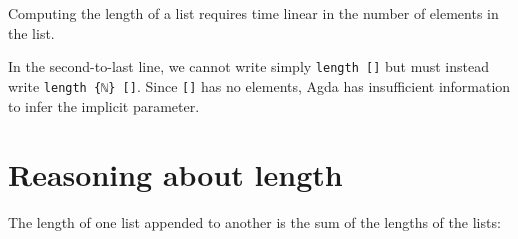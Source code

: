 Computing the length of a list requires time linear in the number of
elements in the list.

In the second-to-last line, we cannot write simply
\texttt{length\ {[}{]}} but must instead write
\texttt{length\ \{ℕ\}\ {[}{]}}. Since \texttt{{[}{]}} has no elements,
Agda has insufficient information to infer the implicit parameter.

\hypertarget{reasoning-about-length}{%
\section{Reasoning about length}\label{reasoning-about-length}}

The length of one list appended to another is the sum of the lengths of
the lists:

\begin{fence}
\begin{code}%
\>[0]\AgdaSpace{}%
\AgdaSymbol{:}\AgdaSpace{}%
\AgdaSpace{}%
\AgdaSymbol{\{}\AgdaSpace{}%
\AgdaSymbol{:}\AgdaSpace{}%
\AgdaSymbol{\}}\AgdaSpace{}%
\AgdaSymbol{(}\AgdaSpace{}%
\AgdaSpace{}%
\AgdaSymbol{:}\AgdaSpace{}%
\AgdaSpace{}%
\AgdaSymbol{)}\<%
\\
\>[0][@{}l@{\AgdaIndent{0}}]%
\>[2]\AgdaSpace{}%
\AgdaSpace{}%
\AgdaSymbol{(}\AgdaSpace{}%
\AgdaOperator{\AgdaFunction{++}}\AgdaSpace{}%
\AgdaSymbol{)}\AgdaSpace{}%
\AgdaSpace{}%
\AgdaSpace{}%
\AgdaSpace{}%
\AgdaOperator{\AgdaPrimitive{+}}\AgdaSpace{}%
\AgdaSpace{}%
\<%
\\
\>[0]\AgdaSpace{}%
\AgdaSymbol{\{}\AgdaSymbol{\}}\AgdaSpace{}%
\AgdaInductiveConstructor{[]}\AgdaSpace{}%
\AgdaSpace{}%
\AgdaSymbol{=}\<%
\\
\>[0][@{}l@{\AgdaIndent{0}}]%
\>[2]\<%
\\
\>[2][@{}l@{\AgdaIndent{0}}]%
\>[4]\AgdaSpace{}%
\AgdaSymbol{(}\AgdaInductiveConstructor{[]}\AgdaSpace{}%
\AgdaOperator{\AgdaFunction{++}}\AgdaSpace{}%
\AgdaSymbol{)}\<%
\\
%
\>[2]\<%
\\
\>[2][@{}l@{\AgdaIndent{0}}]%
\>[4]\AgdaSpace{}%

\end{code}
\end{fence}
